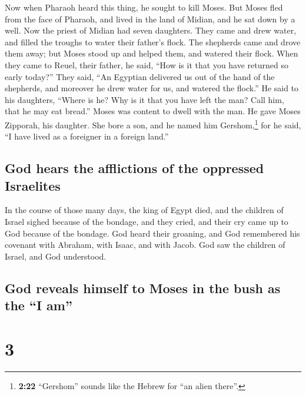  Now when Pharaoh heard this thing, he sought to kill
Moses. But Moses fled from the face of Pharaoh, and lived in the land of
Midian, and he sat down by a well.  Now the priest of
Midian had seven daughters. They came and drew water, and filled the
troughs to water their father's flock.  The shepherds
came and drove them away; but Moses stood up and helped them, and
watered their flock.  When they came to Reuel, their
father, he said, ``How is it that you have returned so early today?''
 They said, ``An Egyptian delivered us out of the hand of
the shepherds, and moreover he drew water for us, and watered the
flock.''  He said to his daughters, ``Where is he? Why is
it that you have left the man? Call him, that he may eat bread.''
 Moses was content to dwell with the man. He gave Moses
Zipporah, his daughter.  She bore a son, and he named him
Gershom,\footnote{\textbf{2:22} ``Gershom'' sounds like the Hebrew for
  ``an alien there''.} for he said, ``I have lived as a foreigner in a
foreign land.''

\hypertarget{god-hears-the-afflictions-of-the-oppressed-israelites}{%
\subsection{God hears the afflictions of the oppressed
Israelites}\label{god-hears-the-afflictions-of-the-oppressed-israelites}}

 In the course of those many days, the king of Egypt
died, and the children of Israel sighed because of the bondage, and they
cried, and their cry came up to God because of the bondage.
 God heard their groaning, and God remembered his
covenant with Abraham, with Isaac, and with Jacob.  God
saw the children of Israel, and God understood.

\hypertarget{god-reveals-himself-to-moses-in-the-bush-as-the-i-am}{%
\subsection{God reveals himself to Moses in the bush as the ``I
am''}\label{god-reveals-himself-to-moses-in-the-bush-as-the-i-am}}

\hypertarget{section-2}{%
\section{3}\label{section-2}}

